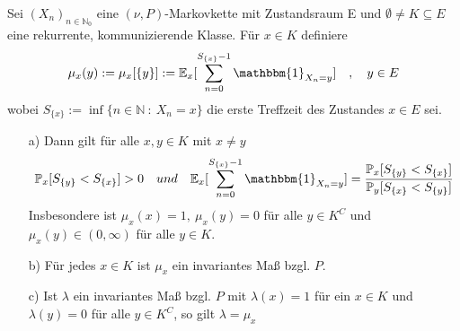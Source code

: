 \label{aufzählungen existenz von invarianten Maßen}
Sei $(X_{n})_{n \in \mathbb{N}_{0}}$ eine $(\nu,P)$-Markovkette mit Zustandsraum E und $\emptyset \neq K \subseteq E$ eine rekurrente, kommunizierende Klasse. Für $x \in K$ definiere
\begin{equation*}
\mu_{x}(y) := \mu_{x}[\lbrace y \rbrace] := \mathbb{E}_{x}[\sum_{n=0}^{S_{\lbrace x \rbrace} - 1} \mathbbm{1}_{X_{n} = y}] \quad , \quad y \in E
\end{equation*}
wobei $S_{\lbrace x \rbrace} := \inf \lbrace n \in \mathbb{N} \: : \: X_{n} = x  \rbrace$ die erste Treffzeit des Zustandes $x \in E$ sei.
\begin{itemize}
\item[a)] Dann gilt für alle $x,y \in K$ mit $x \neq y$
\begin{equation*}
\mathbb{P}_{x}[S_{\lbrace y \rbrace} < S_{\lbrace x \rbrace}] > 0 \quad und \quad \mathbb{E}_{x}[\sum_{n=0}^{S_{\lbrace x \rbrace} - 1} \mathbbm{1}_{X_{n} = y}] = \dfrac{\mathbb{P}_{x}[S_{\lbrace y \rbrace} < S_{\lbrace x \rbrace}]}{\mathbb{P}_{y}[S_{\lbrace x \rbrace} < S_{\lbrace y \rbrace}]}
\end{equation*} 
Insbesondere ist $\mu_{x}(x)=1, \: \mu_{x}(y) =0$ für alle $y \in K^{C}$ und $\mu_{x}(y) \in (0,\infty)$ für alle $y \in K$.
\item[b)] Für jedes $x \in K$ ist $\mu_{x}$ ein invariantes Maß bzgl. $P$.
\item[c)] Ist $\lambda$ ein invariantes Maß bzgl. $P$ mit $\lambda(x) =1$ für ein $x \in K$ und $\lambda(y) = 0$ für alle $y \in K^{C}$, so gilt $\lambda = \mu_{x}$ 
\end{itemize}